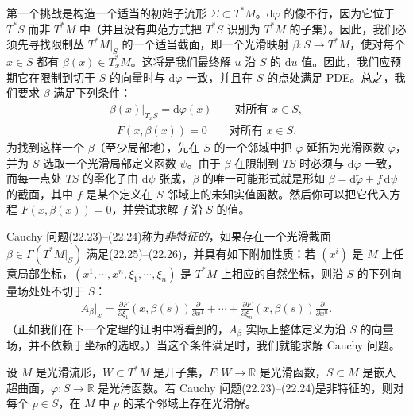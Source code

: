 \documentclass[../../main.tex]{subfiles}
\begin{document}
第一个挑战是构造一个适当的初始子流形 $\Sigma\subset T^*M$。$\mathrm{d}\varphi$ 的像不行，因为它位于 $T^*S$ 而非 $T^*M$ 中（并且没有典范方式把 $T^*S$ 识别为 $T^*M$ 的子集）。因此，我们必须先寻找限制丛 $T^*M|_S$ 的一个适当截面，即一个光滑映射 $\beta:S\to T^*M$，使对每个 $x\in S$ 都有 $\beta(x)\in T^*_xM$。这将是我们最终解 $u$ 沿 $S$ 的 $\mathrm{d}u$ 值。因此，我们应预期它在限制到切于 $S$ 的向量时与 $\mathrm{d}\varphi$ 一致，并且在 $S$ 的点处满足 PDE。总之，我们要求 $\beta$ 满足下列条件：
\begin{align}
\beta(x)|_{T_xS}=\mathrm{d}\varphi(x)\qquad\text{对所有 }x\in S,
\end{align}
\begin{align}
F(x,\beta(x))=0\qquad\text{对所有 }x\in S.
\end{align}
为找到这样一个 $\beta$（至少局部地），先在 $S$ 的一个邻域中把 $\varphi$ 延拓为光滑函数 $\widetilde\varphi$，并为 $S$ 选取一个光滑局部定义函数 $\psi$。由于 $\beta$ 在限制到 $TS$ 时必须与 $\mathrm{d}\varphi$ 一致，而每一点处 $TS$ 的零化子由 $\mathrm{d}\psi$ 张成，$\beta$ 的唯一可能形式就是形如 $\beta=\mathrm{d}\widetilde\varphi+f\,\mathrm{d}\psi$ 的截面，其中 $f$ 是某个定义在 $S$ 邻域上的未知实值函数。然后你可以把它代入方程 $F(x,\beta(x))=0$，并尝试求解 $f$ 沿 $S$ 的值。

Cauchy 问题(22.23)--(22.24)称为\emph{非特征的}，如果存在一个光滑截面 $\beta\in\Gamma(T^*M|_S)$ 满足(22.25)--(22.26)，并具有如下附加性质：若 $(x^i)$ 是 $M$ 上任意局部坐标，$(x^1,\cdots ,x^n,\xi_1,\cdots ,\xi_n)$ 是 $T^*M$ 上相应的自然坐标，则沿 $S$ 的下列向量场处处不切于 $S$：
\begin{align}
A_\beta|_x=\frac{\partial F}{\partial\xi_1}(x,\beta(s))\frac{\partial}{\partial x^1}+\cdots+\frac{\partial F}{\partial\xi_n}(x,\beta(s))\frac{\partial}{\partial x^n}.
\end{align}
（正如我们在下一个定理的证明中将看到的，$A_\beta$ 实际上整体定义为沿 $S$ 的向量场，并不依赖于坐标的选取。）当这个条件满足时，我们就能求解 Cauchy 问题。

\begin{theorem}\label{theorem:ch22-hamilton-jacobi-cauchy}
设 $M$ 是光滑流形，$W\subset T^*M$ 是开子集，$F:W\to\mathbb R$ 是光滑函数，$S\subset M$ 是嵌入超曲面，$\varphi:S\to\mathbb R$ 是光滑函数。若 Cauchy 问题(22.23)--(22.24)是非特征的，则对每个 $p\in S$，在 $M$ 中 $p$ 的某个邻域上存在光滑解。
\end{theorem}
\end{document}
